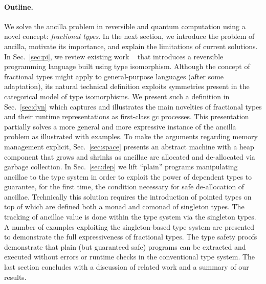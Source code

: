 \documentclass[sigplan,10pt,review,anonymous]{acmart}
\begin{document}
\paragraph*{Outline.} We solve the ancilla problem in reversible and quantum
computation using a novel concept: \emph{fractional types}. In the next
section, we introduce the problem of ancilla, motivate its importance, and
explain the limitations of current solutions. In Sec.~\ref{sec:pi}, we review
existing work%
~\cite{rc2011,DBLP:conf/esop/CaretteS16,rc2012,James:2012:IE:2103656.2103667}
that introduces a reversible programming language built using type isomorphism.
Although the concept of fractional
types might apply to general-purpose languages (after some
adaptation), its natural technical definition exploits symmetries
present in the categorical model of type isomorphisms. We present such a
definition in Sec.~\ref{sec:dyn} which captures and illustrates the
main novelties of fractional types and their runtime representations
as first-class gc processes. This presentation partially solves a more
general and more expressive instance of the ancilla problem as
illustrated with examples. 
To make the arguments regarding memory
management explicit, Sec.~\ref{sec:space} presents an abstract machine
with a heap component that grows and shrinks as ancillae are allocated
and de-allocated via garbage collection. In Sec.~\ref{sec:dep} we
lift ``plain'' programs manipulating ancillae to the type system in
order to exploit the power of dependent types to guarantee, for the
first time, the condition necessary for safe de-allocation of
ancillae. Technically this solution requires the introduction of
pointed types on top of which are defined both a monad and comonad of
singleton types. The tracking of ancillae value is done within the
type system via the singleton types. A number of examples exploiting
the singleton-based type system are presented to demonstrate the full
expressiveness of fractional types. The type safety proofs demonstrate
that plain (but guaranteed safe)
programs can be extracted and executed without errors or runtime
checks in the conventional type system. The last section concludes
with a discussion of related work and a summary of our results.
\end{document}
